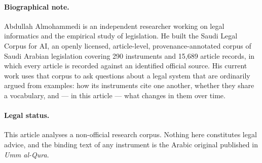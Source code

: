 \documentclass[11pt]{article}
\begin{document}
\paragraph{Biographical note.} Abdullah Almohammedi is an independent
researcher working on legal informatics and the empirical study of legislation.
He built the Saudi Legal Corpus for AI, an openly licensed, article-level,
provenance-annotated corpus of Saudi Arabian legislation covering 290
instruments and 15,689 article records, in which every article is recorded
against an identified official source. His current work uses that corpus to
ask questions about a legal system that are ordinarily argued from examples:
how its instruments cite one another, whether they share a vocabulary, and ---
in this article --- what changes in them over time.

\paragraph{Legal status.} This article analyses a non-official research
corpus. Nothing here constitutes legal advice, and the binding text of any
instrument is the Arabic original published in \emph{Umm al-Qura}.
\fi
\end{document}
